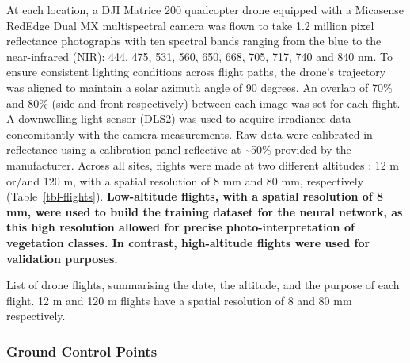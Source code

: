 \documentclass[
  number]{elsarticle}
\begin{document}
At each location, a DJI Matrice 200 quadcopter drone equipped with a
Micasense RedEdge Dual MX multispectral camera was flown to take 1.2
million pixel reflectance photographs with ten spectral bands ranging
from the blue to the near-infrared (NIR): 444, 475, 531, 560, 650, 668,
705, 717, 740 and 840 nm. To ensure consistent lighting conditions
across flight paths, the drone's trajectory was aligned to maintain a
solar azimuth angle of 90 degrees. An overlap of 70\% and 80\% (side and
front respectively) between each image was set for each flight. A
downwelling light sensor (DLS2) was used to acquire irradiance data
concomitantly with the camera measurements. Raw data were calibrated in
reflectance using a calibration panel reflective at \textasciitilde50\%
provided by the manufacturer. Across all sites, flights were made at two
different altitudes : 12 m or/and 120 m, with a spatial resolution of 8
mm and 80 mm, respectively (Table~\ref{tbl-flights}).
\textbf{Low-altitude flights, with a spatial resolution of 8 mm, were
used to build the training dataset for the neural network, as this high
resolution allowed for precise photo-interpretation of vegetation
classes. In contrast, high-altitude flights were used for validation
purposes.}

\begin{table}

\caption{\label{tbl-flights}List of drone flights, summarising the date,
the altitude, and the purpose of each flight. 12 m and 120 m flights
have a spatial resolution of 8 and 80 mm respectively.}


\end{table}%

\subsubsection{Ground Control Points}\label{ground-control-points}
\end{document}
